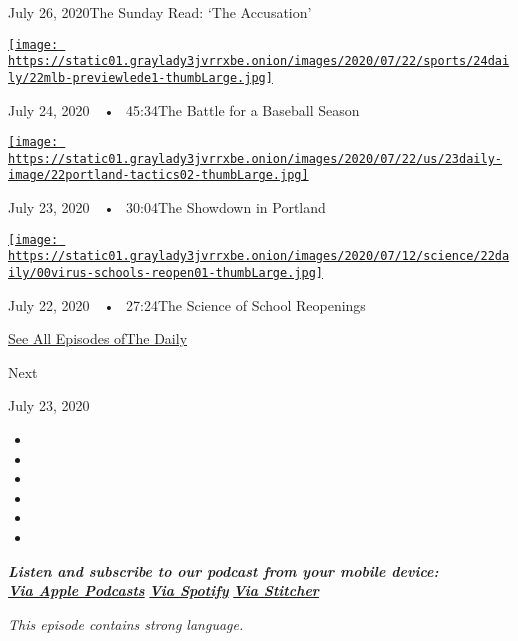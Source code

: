 July 26, 2020The Sunday Read: `The Accusation'

\href{https://www.nytimes3xbfgragh.onion/2020/07/24/podcasts/the-daily/mlb-baseball-season-coronavirus.html?action=click\&module=audio-series-bar\&region=header\&pgtype=Article}{\texttt{[image: https://static01.graylady3jvrrxbe.onion/images/2020/07/22/sports/24daily/22mlb-previewlede1-thumbLarge.jpg]}}

July 24, 2020~~•~ 45:34The Battle for a Baseball Season

\href{https://www.nytimes3xbfgragh.onion/2020/07/23/podcasts/the-daily/portland-protests.html?action=click\&module=audio-series-bar\&region=header\&pgtype=Article}{\texttt{[image: https://static01.graylady3jvrrxbe.onion/images/2020/07/22/us/23daily-image/22portland-tactics02-thumbLarge.jpg]}}

July 23, 2020~~•~ 30:04The Showdown in Portland

\href{https://www.nytimes3xbfgragh.onion/2020/07/22/podcasts/the-daily/school-reopenings-coronavirus.html?action=click\&module=audio-series-bar\&region=header\&pgtype=Article}{\texttt{[image: https://static01.graylady3jvrrxbe.onion/images/2020/07/12/science/22daily/00virus-schools-reopen01-thumbLarge.jpg]}}

July 22, 2020~~•~ 27:24The Science of School Reopenings

\href{https://www.nytimes3xbfgragh.onion/column/the-daily}{See All
Episodes ofThe Daily}

Next

July 23, 2020

\begin{itemize}
\item
\item
\item
\item
\item
\item
\end{itemize}

\emph{\textbf{Listen and subscribe to our podcast from your mobile
device:}}\\
\textbf{\href{https://itunes.apple.com/us/podcast/the-daily/id1200361736?mt=2}{\emph{Via
Apple Podcasts}}} \emph{\textbf{\textbar{}}}
\textbf{\href{https://open.spotify.com/show/3IM0lmZxpFAY7CwMuv9H4g?si=SfuMSC55R1qprFsRZU3_zw}{\emph{Via
Spotify}}} \emph{\textbf{\textbar{}}}
\textbf{\href{http://www.stitcher.com/podcast/the-new-york-times/the-daily-10}{\emph{Via
Stitcher}}}

\emph{This episode contains strong language.}

